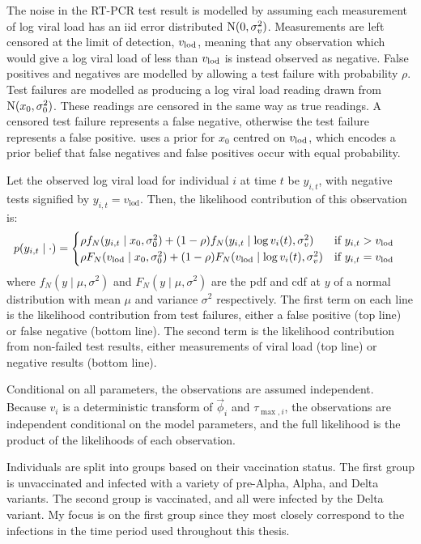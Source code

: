 \documentclass[thesis.tex]{subfiles}
\begin{document}
The noise in the RT-PCR test result is modelled by assuming each measurement of log viral load has an iid error distributed $\operatorname{N}(0, \sigma_v^2)$.
Measurements are left censored at the limit of detection, $v_\text{lod}$, meaning that any observation which would give a log viral load of less than $v_\text{lod}$ is instead observed as negative.
False positives and negatives are modelled by allowing a test failure with probability $\rho$.
Test failures are modelled as producing a log viral load reading drawn from $\operatorname{N}(x_0, \sigma_0^2)$.
These readings are censored in the same way as true readings.
A censored test failure represents a false negative, otherwise the test failure represents a false positive.
\textcite{hakkiOnset} uses a prior for $x_0$ centred on $v_\text{lod}$, which encodes a prior belief that false negatives and false positives occur with equal probability.

Let the observed log viral load for individual $i$ at time $t$ be $y_{i,t}$, with negative tests signified by $y_{i,t}=v_\text{lod}$.
Then, the likelihood contribution of this observation is:
\begin{align}
p(y_{i,t} \mid \cdot) &= \begin{cases}
    \rho f_N(y_{i,t} \mid x_0, \sigma_0^2) + (1 - \rho) f_N(y_{i,t} \mid \log v_i(t), \sigma_v^2) & \text{if $y_{i,t} > v_\text{lod}$}\\
    \rho F_N(v_\text{lod} \mid x_0, \sigma_0^2) + (1 - \rho) F_N(v_\text{lod} \mid \log v_i(t), \sigma_v^2) & \text{if $y_{i,t} = v_\text{lod}$} \label{ATACCC:eq:hakki-likelihood}
\end{cases}
\end{align}
where $f_N(y \mid \mu, \sigma^2)$ and $F_N(y \mid \mu, \sigma^2)$ are the pdf and cdf at $y$ of a normal distribution with mean $\mu$ and variance $\sigma^2$ respectively.
The first term on each line is the likelihood contribution from test failures, either a false positive (top line) or false negative (bottom line).
The second term is the likelihood contribution from non-failed test results, either measurements of viral load (top line) or negative results (bottom line).

Conditional on all parameters, the observations are assumed independent.
Because $v_i$ is a deterministic transform of $\vec{\phi}_i$ and $\tau_{\max,i}$, the observations are independent conditional on the model parameters, and the full likelihood is the product of the likelihoods of each observation.

Individuals are split into groups based on their vaccination status.
The first group is unvaccinated and infected with a variety of pre-Alpha, Alpha, and Delta variants.
The second group is vaccinated, and all were infected by the Delta variant.
My focus is on the first group since they most closely correspond to the infections in the time period used throughout this thesis.
\end{document}
